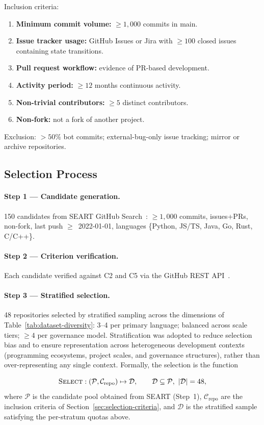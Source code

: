 Inclusion criteria:
\begin{enumerate}
    \item \textbf{Minimum commit volume:} $\geq 1{,}000$ commits in main.
    \item \textbf{Issue tracker usage:} GitHub Issues or Jira with
    $\geq 100$ closed issues containing state transitions.
    \item \textbf{Pull request workflow:} evidence of PR-based development.
    \item \textbf{Activity period:} $\geq 12$ months continuous activity.
    \item \textbf{Non-trivial contributors:} $\geq 5$ distinct contributors.
    \item \textbf{Non-fork:} not a fork of another project.
\end{enumerate}

Exclusion: $>50\%$ bot commits; external-bug-only issue tracking; mirror
or archive repositories.


\subsection{Selection Process}
\label{sec:selection-process}

\paragraph{Step 1 — Candidate generation.} 150 candidates from SEART
GitHub Search~\cite{seart2021}: $\geq 1{,}000$ commits, issues+PRs,
non-fork, last push $\geq$~2022-01-01, languages
\{Python, JS/TS, Java, Go, Rust, C/C++\}.

\paragraph{Step 2 — Criterion verification.} Each candidate verified
against C2 and C5 via the GitHub REST API~\cite{github2023api}.

\paragraph{Step 3 — Stratified selection.} 48 repositories selected by
stratified sampling across the dimensions of
Table~\ref{tab:dataset-diversity}: 3--4 per primary language; balanced
across scale tiers; $\geq 4$ per governance model. Stratification was
adopted to reduce selection bias and to ensure representation across
heterogeneous development contexts (programming ecosystems, project scales,
and governance structures), rather than over-representing any single
context. Formally, the selection is the function
\begin{definition}
\label{def:repo-selection}
\[
\textsc{Select}: (\mathcal{P}, \mathcal{C}_{\text{repo}}) \mapsto
\mathcal{D}, \qquad \mathcal{D} \subseteq \mathcal{P},\ |\mathcal{D}| = 48,
\]
where $\mathcal{P}$ is the candidate pool obtained from SEART (Step~1),
$\mathcal{C}_{\text{repo}}$ are the inclusion criteria of
Section~\ref{sec:selection-criteria}, and $\mathcal{D}$ is the stratified
sample satisfying the per-stratum quotas above.
\end{definition}

